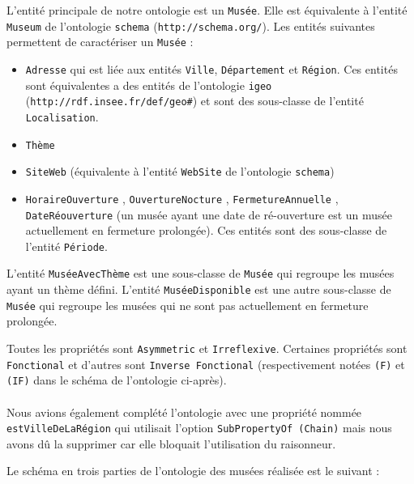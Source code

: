 \documentclass{article}
\begin{document}
L'entité principale de notre ontologie est un \texttt{Musée}. Elle est
équivalente à l'entité \texttt{Museum} de l'ontologie \texttt{schema}
(\texttt{http://schema.org/}). Les entités suivantes permettent de caractériser
un \texttt{Musée} : 
\begin{itemize}
  \item \texttt{Adresse} qui est liée aux entités \texttt{Ville},
\texttt{Département} et \texttt{Région}. Ces entités sont
équivalentes a des entités de l'ontologie \texttt{igeo}
(\texttt{http://rdf.insee.fr/def/geo\#}) et sont des sous-classe de l'entité
\texttt{Localisation}.
  \item \texttt{Thème}
  \item \texttt{SiteWeb} (équivalente à
l'entité \texttt{WebSite} de l'ontologie \texttt{schema})
\item \texttt{HoraireOuverture} , \texttt{OuvertureNocture}
, \texttt{FermetureAnnuelle} , \texttt{DateRéouverture} (un musée ayant une date
de ré-ouverture est un musée actuellement en fermeture prolongée). Ces entités
sont des sous-classe de l'entité \texttt{Période}.
\end{itemize}

\vspace{0.3cm}

L'entité \texttt{MuséeAvecThème} est une sous-classe de \texttt{Musée} qui
regroupe les musées ayant un thème défini. L'entité \texttt{MuséeDisponible} est
une autre sous-classe de \texttt{Musée} qui regroupe les musées qui ne sont
pas actuellement en fermeture prolongée.

\vspace{0.3cm}

Toutes les propriétés sont \texttt{Asymmetric} et \texttt{Irreflexive}.
Certaines propriétés sont \texttt{Fonctional} et d'autres sont
\texttt{Inverse Fonctional} (respectivement notées \texttt{(F)} et \texttt{(IF)}
dans le schéma de l'ontologie ci-après).

\paragraph{\starredbullet} Nous avions également complété l'ontologie avec une
propriété nommée \texttt{estVilleDeLaRégion} qui utilisait l'option
\texttt{SubPropertyOf (Chain)} mais nous avons dû la supprimer car elle
bloquait l'utilisation du raisonneur.

\newpage

Le schéma en trois parties de l'ontologie des musées réalisée est le suivant :
\end{document}
